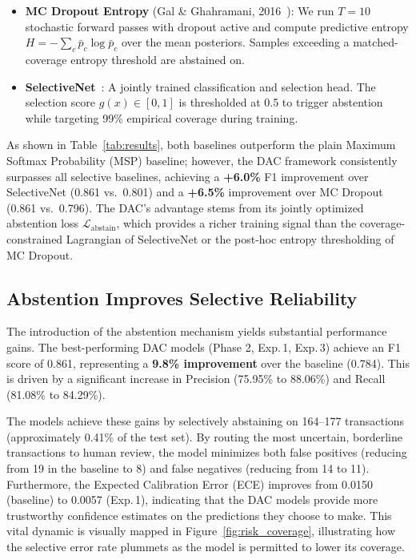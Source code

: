 \documentclass[12pt,a4paper]{article}
\begin{document}
\begin{itemize}
  \item \textbf{MC Dropout Entropy} (Gal \& Ghahramani, 2016~\cite{b7}): We run
        $T=10$ stochastic forward passes with dropout active and compute
        predictive entropy $H = -\sum_c \bar{p}_c \log \bar{p}_c$ over the
        mean posteriors. Samples exceeding a matched-coverage entropy threshold
        are abstained on.
  \item \textbf{SelectiveNet}~\cite{b11}: A jointly trained classification and
        selection head. The selection score $g(x)\in[0,1]$ is thresholded at
        0.5 to trigger abstention while targeting 99\% empirical coverage
        during training.
\end{itemize}

As shown in Table~\ref{tab:results}, both baselines outperform the plain
Maximum Softmax Probability (MSP) baseline; however, the DAC framework
consistently surpasses all selective baselines, achieving a \textbf{+6.0\%}
F1 improvement over SelectiveNet (0.861 vs.\ 0.801) and a \textbf{+6.5\%}
improvement over MC Dropout (0.861 vs.\ 0.796). The DAC's advantage stems from
its jointly optimized abstention loss $\mathcal{L}_{\text{abstain}}$, which
provides a richer training signal than the coverage-constrained Lagrangian of
SelectiveNet or the post-hoc entropy thresholding of MC Dropout.

\subsection{Abstention Improves Selective Reliability}

The introduction of the abstention mechanism yields substantial performance
gains. The best-performing DAC models (Phase 2, Exp.\,1, Exp.\,3) achieve an F1
score of 0.861, representing a \textbf{9.8\% improvement} over the baseline
(0.784). This is driven by a significant increase in Precision (75.95\% to
88.06\%) and Recall (81.08\% to 84.29\%).

The models achieve these gains by selectively abstaining on 164--177
transactions (approximately 0.41\% of the test set). By routing the most
uncertain, borderline transactions to human review, the model minimizes both
false positives (reducing from 19 in the baseline to 8) and false negatives
(reducing from 14 to 11). Furthermore, the Expected Calibration Error (ECE)
improves from 0.0150 (baseline) to 0.0057 (Exp.\,1), indicating that the DAC
models provide more trustworthy confidence estimates on the predictions they
choose to make. This vital dynamic is visually mapped in
Figure~\ref{fig:risk_coverage}, illustrating how the selective error rate
plummets as the model is permitted to lower its coverage.
\end{document}
